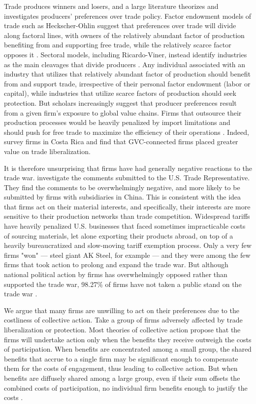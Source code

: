 \documentclass{article}
\begin{document}
Trade produces winners and losers, and a large literature theorizes and investigates producers' preferences over trade policy. Factor endowment models of trade such as Heckscher-Ohlin suggest that preferences over trade will divide along factoral lines, with owners of the relatively abundant factor of production benefiting from and supporting free trade, while the relatively scarce factor opposes it \citep{rogowski1987political}. Sectoral models, including Ricardo-Viner, instead identify industries as the main cleavages that divide producers \citep{hiscox2002international}. Any individual associated with an industry that utilizes that relatively abundant factor of production should benefit from and support trade, irrespective of their personal factor endowment (labor or capital), while industries that utilize scarce factors of production should seek protection. But scholars increasingly suggest that producer preferences result from a given firm's exposure to global value chains. Firms that outsource their production processes would be heavily penalized by import limitations and should push for free trade to maximize the efficiency of their operations \citep{farrell2016new}. Indeed, \citet{kim2019firms2} survey firms in Costa Rica and find that GVC-connected firms placed greater value on trade liberalization.

It is therefore unsurprising that firms have had generally negative reactions to the trade war. \citet{lee2021firms} investigate the comments submitted to the U.S. Trade Representative. They find the comments to be overwhelmingly negative, and more likely to be submitted by firms with subsidiaries in China. This is consistent with the idea that firms act on their material interests, and specifically, their interests are more sensitive to their production networks than trade competition. Widespread tariffs have heavily penalized U.S. businesses that faced sometimes impracticable costs of sourcing materials, let alone exporting their products abroad, on top of a heavily bureaucratized and slow-moving tariff exemption process. Only a very few firms "won" --- steel giant AK Steel, for example --- and they were among the few firms that took action to prolong and expand the trade war. But although national political action by firms has overwhelmingly opposed rather than supported the trade war, 98.27\% of firms have not taken a public stand on the trade war \citep{zhu2021firms}.

We argue that many firms are unwilling to act on their preferences due to the costliness of collective action. Take a group of firms adversely affected by trade liberalization or protection. Most theories of collective action propose that the firms will undertake action only when the benefits they receive outweigh the costs of participation. When benefits are concentrated among a small group, the shared benefits that accrue to a single firm may be significant enough to compensate them for the costs of engagement, thus leading to collective action. But when benefits are diffusely shared among a large group, even if their sum offsets the combined costs of participation, no individual firm benefits enough to justify the costs \citep{olson1965logic}.
\end{document}
